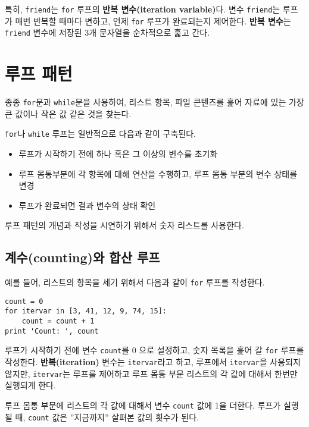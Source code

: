 특히, {\tt friend}는 {\tt for} 루프의 {\bf 반복 변수(iteration variable)}다. 
변수 {\tt friend}는 루프가 매번 반복할 때마다 변하고, 언제 {\tt for} 루프가 완료되는지 제어한다.
{\bf 반복 변수}는 {\tt friend} 변수에 저장된 3개 문자열을 순차적으로 훑고 간다.

\section{  루프 패턴}

종종 {\tt for}문과 {\tt while}문을 사용하여, 리스트 항목, 파일 콘텐츠를 훑어 자료에 있는 가장 큰 값이나 작은 값 같은 것을 찾는다.

{\tt for}나 {\tt while} 루프는 일반적으로 다음과 같이 구축된다.

\begin{itemize}

\item 루프가 시작하기 전에 하나 혹은 그 이상의 변수를 초기화

\item 루프 몸통부분에 각 항목에 대해 연산을 수행하고, 루프 몸통 부분의 변수 상태를 변경

\item 루프가 완료되면 결과 변수의 상태 확인

\end{itemize}

루프 패턴의 개념과 작성을 시연하기 위해서 숫자 리스트를 사용한다.

\subsection{  계수(counting)와 합산 루프}

예를 들어, 리스트의 항목을 세기 위해서 다음과 같이 {\tt for} 루프를 작성한다.

\beforeverb
\begin{verbatim}
count = 0
for itervar in [3, 41, 12, 9, 74, 15]:
    count = count + 1
print 'Count: ', count
\end{verbatim}
\afterverb
%

루프가 시작하기 전에 변수 {\tt count}를 0 으로 설정하고, 숫자 목록을 훑어 갈 {\tt for} 루프를 작성한다.
{\bf 반복(iteration)} 변수는 {\tt itervar}라고 하고, 
루프에서 {\tt itervar}을 사용되지 않지만,
{\tt itervar}는 루프를 제어하고 루프 몸통 부문 리스트의 각 값에 대해서 한번만 실행되게 한다.

루프 몸통 부문에 리스트의 각 값에 대해서 변수 {\tt count} 값에 1을 더한다.
루프가 실행될 때, {\tt count} 값은 ''지금까지'' 살펴본 값의 횟수가 된다.

